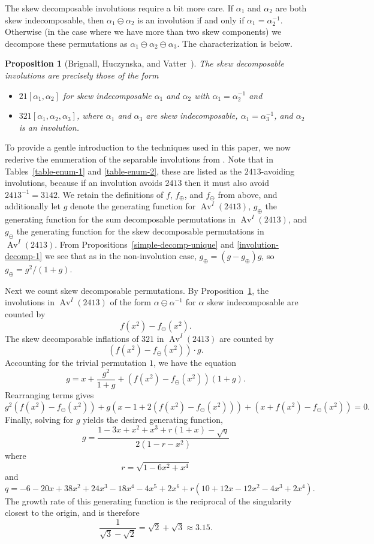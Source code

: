\documentclass[10pt]{article}
\theoremstyle{plain}
\newtheorem{proposition}[theorem]{Proposition}
\newcommand{\Av}{\operatorname{Av}}
\newcommand{\ds}{\displaystyle}
\newcommand{\f}[2]{\ds\frac{{#1}}{{#2}}}
\begin{document}
The skew decomposable involutions require a bit more care. If $\alpha_1$ and $\alpha_2$ are both skew indecomposable, then $\alpha_1\ominus\alpha_2$ is an involution if and only if $\alpha_1=\alpha_2^{-1}$. Otherwise (in the case where we have more than two skew components) we decompose these permutations as $\alpha_1\ominus\alpha_2\ominus\alpha_3$. The characterization is below.

\begin{proposition}[Brignall, Huczynska, and Vatter~\cite{brignall:simple-permutat:}]
\label{involution-decomp-2}
The skew decomposable involutions are precisely those of the form
\begin{itemize}
\item $21[\alpha_1,\alpha_2]$ for skew indecomposable $\alpha_1$ and $\alpha_2$ with $\alpha_1=\alpha_2^{-1}$ and
\item $321[\alpha_1,\alpha_2,\alpha_3]$, where $\alpha_1$ and $\alpha_3$ are skew indecomposable, $\alpha_1=\alpha_3^{-1}$, and $\alpha_2$ is an involution.
\end{itemize}
\end{proposition}

To provide a gentle introduction to the techniques used in this paper, we now rederive the enumeration of the separable involutions from \cite{brignall:simple-permutat:}. Note that in Tables~\ref{table-enum-1} and \ref{table-enum-2}, these are listed as the $2413$-avoiding involutions, because if an involution avoids $2413$ then it must also avoid $2413^{-1}=3142$. We retain the definitions of $f$, $f_\oplus$, and $f_\ominus$ from above, and additionally let $g$ denote the generating function for $\Av^I(2413)$, $g_\oplus$ the generating function for the sum decomposable permutations in $\Av^I(2413)$, and $g_\ominus$ the generating function for the skew decomposable permutations in $\Av^I(2413)$. From Propositions~\ref{simple-decomp-unique} and \ref{involution-decomp-1} we see that as in the non-involution case, $g_\oplus=(g-g_\oplus)g$, so $g_\oplus=g^2/(1+g)$.

Next we count skew decomposable permutations. By Proposition~\ref{involution-decomp-2}, the involutions in $\Av^I(2413)$ of the form $\alpha\ominus\alpha^{-1}$ for $\alpha$ skew indecomposable are counted by
	\[
	f(x^2)-f_\ominus(x^2).
	\]
The skew decomposable inflations of $321$ in $\Av^I(2413)$ are counted by
	\[
	\left(f(x^2)-f_\ominus(x^2)\right)\cdot g.
	\]
Accounting for the trivial permutation $1$, we have the equation
	\[g = x + \frac{g^2}{1+g} + \left(f(x^2)-f_\ominus(x^2)\right)\left(1+g\right).\]
Rearranging terms gives
	\[g^2\left(f(x^2)-f_\ominus(x^2)\right) + g\left(x - 1 + 2\left(f(x^2)-f_\ominus(x^2)\right)\right) + \left(x + f(x^2)-f_\ominus(x^2)\right) = 0.\]
Finally, solving for $g$ yields the desired generating function,
	\[g = \frac{1 - 3x + x^2 + x^3 + r(1+x) - \sqrt{q}}{2(1 - r - x^2)}\]
where
	\[r = \sqrt{1-6x^2+x^4}\]
and
	\[q = -6 - 20x + 38x^2 + 24x^3 - 18x^4 - 4x^5 + 2x^6 + r(10 + 12x - 12x^2 - 4x^3 + 2x^4).\]
The growth rate of this generating function is the reciprocal of the singularity closest to the origin, and is therefore
	\[\f{1}{\sqrt{3}-\sqrt{2}} = \sqrt{2} + \sqrt{3} \approx 3.15.\]
\end{document}
